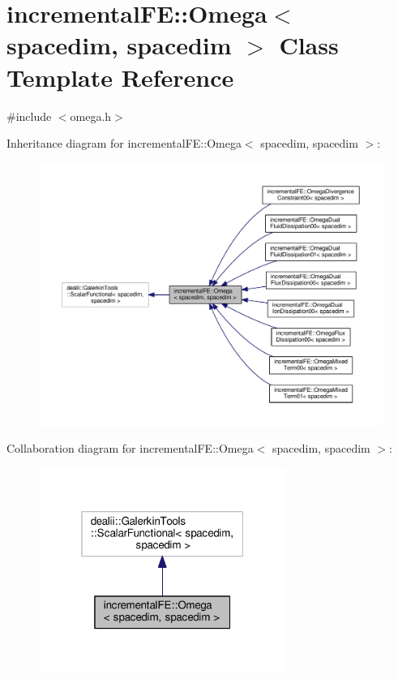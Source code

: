 \hypertarget{classincremental_f_e_1_1_omega_3_01spacedim_00_01spacedim_01_4}{}\section{incremental\+FE\+:\+:Omega$<$ spacedim, spacedim $>$ Class Template Reference}
\label{classincremental_f_e_1_1_omega_3_01spacedim_00_01spacedim_01_4}


{\ttfamily \#include $<$omega.\+h$>$}



Inheritance diagram for incremental\+FE\+:\+:Omega$<$ spacedim, spacedim $>$\+:\nopagebreak
\begin{figure}[H]
\begin{center}
\leavevmode
\includegraphics[width=350pt]{classincremental_f_e_1_1_omega_3_01spacedim_00_01spacedim_01_4__inherit__graph}
\end{center}
\end{figure}


Collaboration diagram for incremental\+FE\+:\+:Omega$<$ spacedim, spacedim $>$\+:\nopagebreak
\begin{figure}[H]
\begin{center}
\leavevmode
\includegraphics[width=229pt]{classincremental_f_e_1_1_omega_3_01spacedim_00_01spacedim_01_4__coll__graph}
\end{center}
\end{figure}
